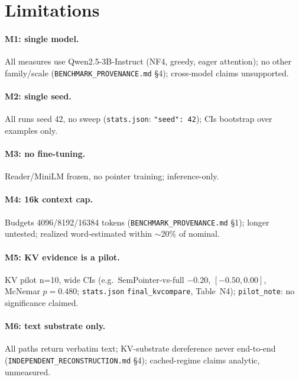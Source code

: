 \section{Limitations}
\label{sec:limitations}

\paragraph{M1: single model.}
All measures use Qwen2.5-3B-Instruct (NF4, greedy, eager attention); no other family/scale (\texttt{BENCHMARK\_PROVENANCE.md} \S4); cross-model claims unsupported.

\paragraph{M2: single seed.}
All runs seed 42, no sweep (\texttt{stats.json}: \texttt{"seed": 42}); CIs bootstrap over examples only.

\paragraph{M3: no fine-tuning.}
Reader/MiniLM frozen, no pointer training; inference-only.

\paragraph{M4: 16k context cap.}
Budgets 4096/8192/16384 tokens (\texttt{BENCHMARK\_PROVENANCE.md} \S1); longer untested; realized word-estimated within $\sim$20\% of nominal.

\paragraph{M5: KV evidence is a pilot.}
KV pilot n=10, wide CIs (e.g.\ SemPointer-vs-full $-0.20$, $[-0.50,0.00]$, McNemar $p=0.480$; \texttt{stats.json} \texttt{final\_kvcompare}, Table~N4); \texttt{pilot\_note}: no significance claimed.

\paragraph{M6: text substrate only.}
All paths return verbatim text; KV-substrate dereference never end-to-end (\texttt{INDEPENDENT\_RECONSTRUCTION.md} \S4); cached-regime claims analytic, unmeasured.


